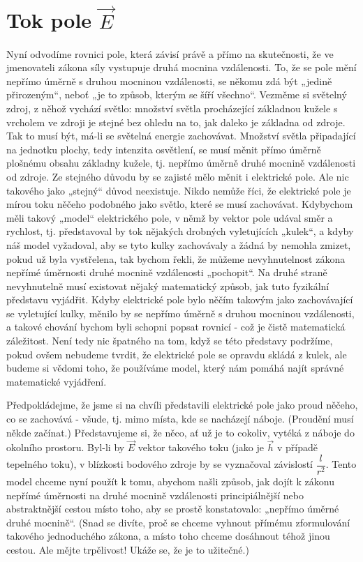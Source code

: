   \section{Tok pole \texorpdfstring{\(\vec{E}\)}{E}}     
    \cite[s.~72]{Feynman02} Nyní odvodíme rovnici pole, která závisí právě a přímo na skutečnosti, 
    že ve jmenovateli zákona síly vystupuje druhá mocnina vzdálenosti. To, že se pole mění nepřímo 
    úměrně s druhou mocninou vzdálenosti, se někomu zdá být „jedině přirozeným“, neboť „je to 
    způsob, kterým se šíří všechno“. Vezměme si světelný zdroj, z něhož vychází světlo: množství 
    světla procházející základnou kužele s vrcholem ve zdroji je stejné bez ohledu na to, jak daleko 
    je základna od zdroje. Tak to musí být, má-li se světelná energie zachovávat. Množství světla 
    připadající na jednotku plochy, tedy intenzita osvětlení, se musí měnit přímo úměrně plošnému 
    obsahu základny kužele, tj. nepřímo úměrně druhé mocnině vzdálenosti od zdroje. Ze stejného 
    důvodu by se zajisté mělo měnit i elektrické pole. Ale nic takového jako „stejný“ důvod 
    neexistuje. Nikdo nemůže říci, že elektrické pole je mírou toku něčeho podobného jako světlo, 
    které se musí zachovávat. Kdybychom měli takový „model“ elektrického pole, v němž by vektor pole 
    udával směr a rychlost, tj. představoval by tok nějakých drobných vyletujících „kulek“, a kdyby 
    náš model vyžadoval, aby se tyto kulky zachovávaly a žádná by nemohla zmizet, pokud už byla 
    vystřelena, tak bychom řekli, že můžeme nevyhnutelnost zákona nepřímé úměrnosti druhé mocnině 
    vzdálenosti „pochopit“. Na druhé straně nevyhnutelně musí existovat nějaký matematický způsob, 
    jak tuto fyzikální představu vyjádřit. Kdyby elektrické pole bylo něčím takovým jako 
    zachovávající se vyletující kulky, měnilo by se nepřímo úměrně s druhou mocninou vzdálenosti, a 
    takové chování bychom byli schopni popsat rovnicí - což je čistě matematická záležitost. Není 
    tedy nic špatného na tom, když se této představy podržíme, pokud ovšem nebudeme tvrdit, že 
    elektrické pole se opravdu skládá z kulek, ale budeme si vědomi toho, že používáme model, který 
    nám pomáhá najít správné matematické vyjádření.

    Předpokládejme, že jsme si na chvíli představili elektrické pole jako proud něčeho, co se 
    zachovává - všude, tj. mimo místa, kde se nacházejí náboje. (Proudění musí někde začínat.) 
    Představujeme si, že něco, ať už je to cokoliv, vytéká z náboje do okolního prostoru. Byl-li by 
    \(\vec{E}\) vektor takového toku (jako je \(\vec{h}\) v případě tepelného toku), v blízkosti 
    bodového zdroje by se vyznačoval závislostí \(\dfrac{l}{r^2}\). Tento model chceme nyní použít k 
    tomu, abychom našli způsob, jak dojít k zákonu nepřímé úměrnosti na druhé mocnině vzdálenosti 
    principiálnější nebo abstraktnější cestou místo toho, aby se prostě konstatovalo: „nepřímo 
    úměrné druhé mocnině“. (Snad se divíte, proč se chceme vyhnout přímému zformulování takového 
    jednoduchého zákona, a místo toho chceme dosáhnout téhož jinou cestou. Ale mějte trpělivost! 
    Ukáže se, že je to užitečné.)
    
